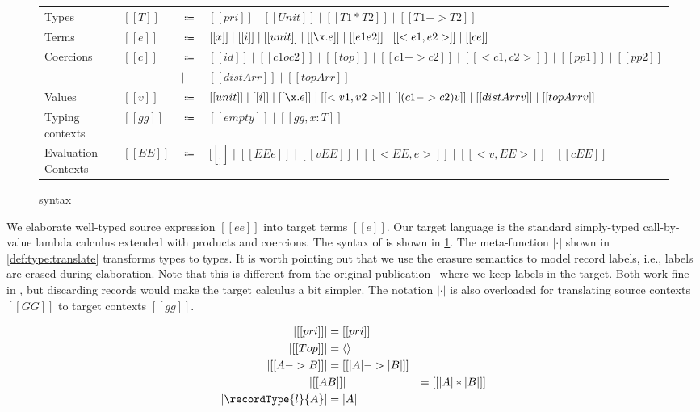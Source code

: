 \begin{figure}[t]
  \centering
\begin{tabular}{llll} \toprule
  Types & $[[T]]$ & $\Coloneqq$ & $[[pri]] \mid [[Unit]] \mid [[T1 * T2]] \mid [[T1 -> T2]] $ \\
  Terms & $[[e]]$ & $\Coloneqq$ & $[[x]] \mid [[i]] \mid [[unit]] \mid [[\x . e]] \mid [[e1 e2]] \mid [[<e1, e2>]] \mid [[c e]]$ \\
  Coercions & $[[c]]$ & $\Coloneqq$ & $ [[id]] \mid [[c1 o c2]] \mid [[top]] \mid [[c1 -> c2]] \mid [[<c1, c2>]] \mid [[pp1]] \mid [[pp2]] $ \\
  &  &  $\mid$ & $   [[distArr]] \mid [[topArr]]  $ \\
  Values & $[[v]]$ & $\Coloneqq$ & $[[unit]] \mid [[i]] \mid [[\x.e]] \mid  [[<v1, v2>]] \mid [[(c1 -> c2) v]] \mid [[distArr v]] \mid [[topArr v]] $ \\
  Typing contexts & $[[gg]]$ & $\Coloneqq$ & $[[empty]] \mid [[gg , x : T]]$ \\
  Evaluation Contexts & $[[EE]]$ & $\Coloneqq$ &  $  [[__]] \mid [[EE e]] \mid [[v EE]] \mid [[ < EE , e >  ]] \mid [[ < v , EE > ]] \mid [[ c EE  ]]$ \\ \bottomrule
\end{tabular}
  \caption{\tname syntax}
  \label{fig:target}
\end{figure}

We elaborate well-typed source expression $[[ee]]$ into target terms $[[e]]$.
Our target language \tname is the standard simply-typed call-by-value lambda
calculus extended with products and coercions. The syntax of \tname is shown in
\cref{fig:target}. The meta-function $| \cdot |$ shown in
\cref{def:type:translate} transforms \namee types to \tname types. It is worth
pointing out that we use the erasure semantics to model record labels, i.e.,
labels are erased during elaboration. Note that this is different from the
original publication~\citep{bi_et_al:LIPIcs:2018:9227} where we keep labels in
the target. Both work fine in \namee, but discarding records would make the
target calculus a bit simpler.
The notation $| \cdot |$ is also overloaded for
translating source contexts $[[GG]]$ to target contexts $[[gg]]$.

\begin{definition} \label{def:type:translate}
  \begin{align*}
    | [[pri]] | &= [[pri]] \\
    | [[Top]] | &= \langle \rangle \\
    | [[A -> B]]  | &= [[ | A | -> | B |  ]] \\
    | [[ A & B  ]] | &= [[ | A | * | B |  ]] \\
    | \recordType{l}{A} | &= | A |
  \end{align*}
\end{definition}



